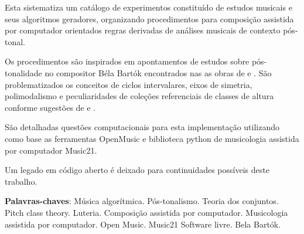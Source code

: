 \documentclass[
	12pt,				%
	openright,			%
	twoside,			%
	a4paper,			%
	english,			%
	french,				%
	spanish,			%
	brazil				%
	]{abntex2}
\begin{document}











\setlength{\absparsep}{18pt} %



\begin{resumo}


Esta sistematiza um catálogo de experimentos constituído de estudos musicais e seus algoritmos geradores, organizando procedimentos para composição assistida por computador orientados regras derivadas de análises musicais de contexto pós-tonal.


Os procedimentos são inspirados em apontamentos de estudos sobre pós-tonalidade no compositor Béla Bartók encontrados nas as obras de  e  . São problematizados os conceitos de ciclos intervalares, eixos de simetria, polimodalismo e peculiaridades de coleções referenciais de classes de altura conforme sugestões de 
 e .

São detalhadas questões computacionais para esta implementação utilizando como base as ferramentas OpenMusic e biblioteca python de musicologia assistida por computador Music21. 

Um legado em código aberto é deixado para continuidades possíveis deste trabalho.


 \textbf{Palavras-chaves}: Música algorítmica. Pós-tonalismo. Teoria dos conjuntos. Pitch class theory. Luteria. Composição assistida por computador. Musicologia assistida por computador. Open Music. Music21 Software livre. Bela Bartók.
\end{resumo}
\end{document}
